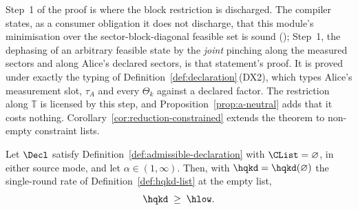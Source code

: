 
Step~1 of the proof is where the block restriction is discharged. The
compiler states, as a consumer obligation it does not discharge, that this
module's minimisation over the sector-block-diagonal feasible set is sound
(); Step~1, the dephasing of an arbitrary
feasible state by the \emph{joint} pinching along the measured sectors and
along Alice's declared sectors, is that statement's proof. It is proved under
exactly the typing of Definition~\ref{def:declaration}\,(DX2), which types
Alice's measurement slot, $\tau_A$ and every $\Theta_k$ against a declared
factor. The restriction along $\mathbb{T}$ is licensed by this step, and
Proposition~\ref{prop:a-neutral} adds that it costs nothing. Corollary~\ref{cor:reduction-constrained} extends the theorem to
non-empty constraint lists.

\begin{theorem}\label{thm:reduction}
Let $\Decl$ satisfy Definition~\ref{def:admissible-declaration} with $\CList=\varnothing$,
in either source mode, and let $\alpha\in(1,\infty)$. Then, with
$\hqkd=\hqkd(\varnothing)$ the single-round rate of
Definition~\ref{def:hqkd-list} at the empty list,
\begin{equation}\label{eq:c8}
  \hqkd\;\ge\;\hlow .
\end{equation}
\end{theorem}

